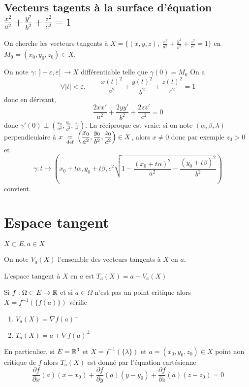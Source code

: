 \subsection{Vecteurs tagents à la surface d'équation $\frac{x^2}{a^2}+\frac{y^2}{b^2}+\frac{z^2}{c^2}=1$}

On cherche les vecteurs tangents à $X=\{(x, y, z), \; \frac{x^2}{a^2}+\frac{y^2}{b^2}+\frac{z^2}{c^2}=1\}$ en $M_0=(x_0,y_0,z_0)\in X$.

On note $\gamma :~]-\varepsilon, \varepsilon[ ~\longrightarrow X$ différentiable telle que $\gamma(0)=M_0$
On a \[
    \forall |t|<\varepsilon, \qquad \frac{x(t)^2}{a^2} + \frac{y(t)^2}{b^2} + \frac{z(t)^2}{c^2}=1
\]
donc en dérivant, \[
    \frac{2xx'}{a^2}+ \frac{2yy'}{b^2} + \frac{2zz'}{c^2} =0
\]
donc $\displaystyle\gamma'(0)\perp \left( \frac{x_0}{a^2}, \frac{y_0}{b^2} , \frac{z_0}{c^2}   \right)$. La réciproque est vraie: si on note $(\alpha, \beta, \lambda)$ perpendiculaire à $\displaystyle x\;\underset{\text{def}}=\;\left( \frac{x_0}{a^2}, \frac{y_0}{b^2} , \frac{z_0}{c^2}   \right)\in X$, alors $x\neq 0$ donc par exemple $z_0>0$ et \[
    \gamma:t\longmapsto \left(x_0+t\alpha, y_0+t\beta, c^2\sqrt{1- \dfrac{(x_0+t\alpha)^2}{a^2}-\dfrac{(y_0+t\beta)^2}{b^2}}\right)
\]
convient.

\section{Espace tangent}

\begin{defprop}
    \Hyp $X\subset E, a\in X$
    \begin{concenum}
    \item On note $V_a(X)$ l'ensemble des vecteurs tangents à $X$ en $a$.
    \item L'espace tangent à $X$ en $a$ est $T_a(X)=a+V_a(X)$
    \item Si $f:\Omega \subset E\to \mathbb R$ et si $a\in \Omega$ n'est pas un point critique alors $X=f^{-1}(\{f(a)\})$ vérifie \begin{enumerate}
        \item $V_a(X)=\nabla f(a)^\perp$
        \item $T_a(X)=a+\nabla f(a)^\perp$
    \end{enumerate}
    En particulier, si $E=\mathbb R^3$ et $X=f^{-1}(\{\lambda\})$ et $a=(x_0, y_0, z_0)\in X$ point non critique de $f$ alors $T_a(X)$ est donné par l'équation cartésienne \[
        \frac{\partial f}{\partial x} (a)(x-x_0)+ \frac{\partial f}{\partial y} (a)(y-y_0)+ \frac{\partial f}{\partial z} (a)(z-z_0)=0
    \]
    \end{concenum}
\end{defprop}

